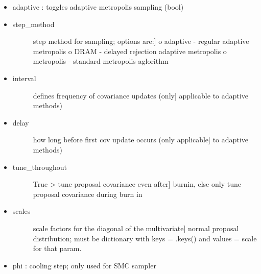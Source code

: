 \documentclass[letterpaper,10pt,english]{sphinxmanual}
\begin{document}
\begin{fulllineitems}
\begin{fulllineitems}
\begin{itemize}
\item {} 
adaptive : toggles adaptive metropolis sampling (bool)

\item {} \begin{description}
\item[{step\_method}] \leavevmode{[}step method for sampling; options are:{]}
o adaptive - regular adaptive metropolis
o DRAM - delayed rejection adaptive metropolis
o metropolis - standard metropolis aglorithm

\end{description}

\item {} \begin{description}
\item[{interval}] \leavevmode{[}defines frequency of covariance updates (only{]}
applicable to adaptive methods)

\end{description}

\item {} \begin{description}
\item[{delay}] \leavevmode{[}how long before first cov update occurs (only applicable{]}
to adaptive methods)

\end{description}

\item {} \begin{description}
\item[{tune\_throughout}] \leavevmode{[}True \textgreater{} tune proposal covariance even after{]}
burnin, else only tune proposal covariance during burn in

\end{description}

\item {} \begin{description}
\item[{scales}] \leavevmode{[}scale factors for the diagonal of the multivariate{]}
normal proposal distribution; must be dictionary with
keys = .keys() and values = scale for that param.

\end{description}

\item {} 
phi : cooling step; only used for SMC sampler

\end{itemize}


\end{fulllineitems}
\end{fulllineitems}
\end{document}
